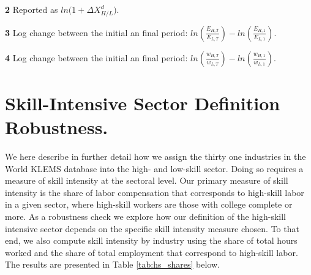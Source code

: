 \documentclass[10pt]{article}
\begin{document}
\begin{landscape}
\begin{table}[h!]
\begin{threepartable}
\begin{tablenotes}
\item{\textbf{2}}  Reported as $ln\Big(1+\Delta X^{d}_{ H/L } \Big)$.\\
\item{\textbf{3}} Log change between the initial an final period: $ln\left(\frac{E_{H,T}}{E_{L,T}}\right)-ln\left(\frac{E_{H,1}}{E_{L,1}}\right)$.\\
\item{\textbf{4}} Log change between the initial an final period: $ln\left(\frac{w_{H,T}}{w_{L,T}}\right)-ln\left(\frac{w_{H,1}}{w_{L,1}}\right)$.\\ \hline
\end{tablenotes}
\end{threepartable}
\end{table}
\end{landscape}
\begin{comment}
Column B
Between Industry Demand Shift:                          Demand_shift_KM_IPUMS_E_KM_Experience.do
Change in Relative Supply of College to HS Equivalents: Demand_shift_KM_IPUMS_E_KM_Experience.do (Lines 159-166)
Total Change in Wage Premium:                           KM_wage_premium_ipums_exp.do
       
Column C
Between Industry Demand Shift:                          Demand_shift_KM_IPUMS_E_KM_Age.do
Change in Relative Supply of College to HS Equivalents: Demand_shift_KM_IPUMS_E_KM_Age.do (Lines 155-162)
Total Change in Wage Premium:                           KM_wage_premium_ipums_age.do
\end{comment}
\section{Skill-Intensive Sector Definition Robustness.} \label{sec:hs_labor_intensity}
We here describe in further detail how we assign the thirty one industries in the World KLEMS database into the high- and low-skill sector. Doing so requires a measure of skill intensity at the sectoral level. Our primary measure of skill intensity is the share of labor compensation that corresponds to high-skill labor in a given sector, where high-skill workers are those with college complete or more. As a robustness check we explore how our definition of the high-skill intensive sector depends on the specific skill intensity measure chosen. To that end, we also compute skill intensity by industry using the share of total hours worked and the share of total employment that correspond to high-skill labor. The results are presented in Table \ref{tab:hs_shares} below.\\
\end{document}
